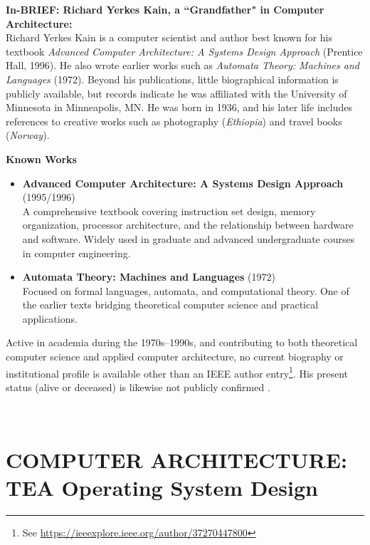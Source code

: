 \documentclass[a4paper, 18pt]{book} %
\begin{document}
{{{{\begin{minipage}{\textwidth}
\textbf{In-BRIEF: Richard Yerkes Kain, a ``Grandfather" in Computer Architecture:}\\


Richard Yerkes Kain is a computer scientist and author best known for his textbook \textit{Advanced Computer Architecture: A Systems Design Approach} (Prentice Hall, 1996)\cite{kain1999advanced}. He also wrote earlier works such as \textit{Automata Theory: Machines and Languages} (1972)\cite{kain1972automata}. Beyond his publications, little biographical information is publicly available, but records indicate he was affiliated with the University of Minnesota in Minneapolis, MN. He was born 
in 1936, and his later life includes references to creative works such as photography (\textit{Ethiopia}) and travel books (\textit{Norway})\cite{copilot_assistant}.

\textbf{Known Works}
\begin{itemize}
  \item \textbf{Advanced Computer Architecture: A Systems Design Approach} (1995/1996) \\
  A comprehensive textbook covering instruction set design, memory organization, processor architecture, 
  and the relationship between hardware and software. Widely used in graduate and advanced undergraduate 
  courses in computer engineering.
  
  \item \textbf{Automata Theory: Machines and Languages} (1972) \\
  Focused on formal languages, automata, and computational theory. One of the earlier texts bridging 
  theoretical computer science and practical applications.
\end{itemize}

Active in academia during the 1970s--1990s, and contributing to both theoretical computer science and applied computer architecture, no current biography or institutional profile is available other than an IEEE author entry\footnote{See \url{https://ieeexplore.ieee.org/author/37270447800}}. His present status (alive or deceased) is likewise not publicly confirmed \cite{copilot_assistant}.

\end{minipage}}
\\



\section{\textbf{COMPUTER ARCHITECTURE:} TEA Operating System Design}
\label{SECTOSSPEC}



}}}
\end{document}
